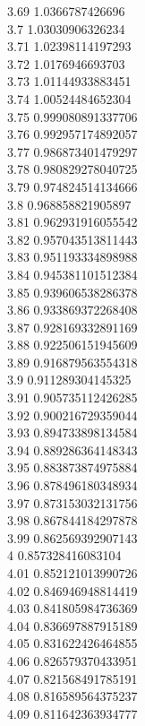 {3.69	1.0366787426696\\
3.7	1.03030906326234\\
3.71	1.02398114197293\\
3.72	1.0176946693703\\
3.73	1.01144933883451\\
3.74	1.00524484652304\\
3.75	0.999080891337706\\
3.76	0.992957174892057\\
3.77	0.986873401479297\\
3.78	0.980829278040725\\
3.79	0.974824514134666\\
3.8	0.968858821905897\\
3.81	0.962931916055542\\
3.82	0.957043513811443\\
3.83	0.951193334898988\\
3.84	0.945381101512384\\
3.85	0.939606538286378\\
3.86	0.933869372268408\\
3.87	0.928169332891169\\
3.88	0.922506151945609\\
3.89	0.916879563554318\\
3.9	0.911289304145325\\
3.91	0.905735112426285\\
3.92	0.900216729359044\\
3.93	0.894733898134584\\
3.94	0.889286364148343\\
3.95	0.883873874975884\\
3.96	0.878496180348934\\
3.97	0.873153032131756\\
3.98	0.867844184297878\\
3.99	0.862569392907143\\
4	0.857328416083104\\
4.01	0.852121013990726\\
4.02	0.846946948814419\\
4.03	0.841805984736369\\
4.04	0.836697887915189\\
4.05	0.831622426464855\\
4.06	0.826579370433951\\
4.07	0.821568491785191\\
4.08	0.816589564375237\\
4.09	0.811642363934777\\
}
